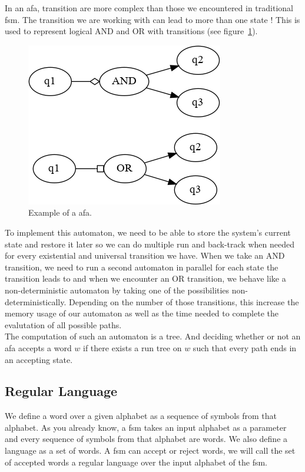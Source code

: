 \documentclass[12pt]{article}
\theoremstyle{definition}
\theoremstyle{definition}
\begin{document}
In an \gls{afa}, transition are more complex than those we encountered in traditional \gls{fsm}. The transition we are working with can lead to more than one state ! This is used to represent logical AND and OR with transitions (see figure~\ref{afa}).\\

\begin{figure}
    \centering
    \includegraphics[scale=0.8]{graph/afa.png}
    \caption{Example of a \gls{afa}.}
    \label{afa}
\end{figure}

To implement this automaton, we need to be able to store the system's current state and restore it later so we can do multiple run and back-track when needed for every existential and universal transition we have. When we take an AND transition, we need to run a second automaton in parallel for each state the transition leads to and when we encounter an OR transition, we behave like a non-deterministic automaton by taking one of the possibilities non-deterministically. Depending on the number of those transitions, this increase the memory usage of our automaton as well as the time needed to complete the evalutation of all possible paths.\\

The computation of such an automaton is a tree. And deciding whether or not an \gls{afa} accepts a word $w$ if there exists a run tree on $w$ such that every path ends in an accepting state.~\cite{AFA:2017}\\

\subsection{Regular Language}

We define a word over a given alphabet as a sequence of symbols from that alphabet. As you already know, a \gls{fsm} takes an input alphabet as a parameter and every sequence of symbols from that alphabet are words. We also define a language as a set of words. A \gls{fsm} can accept or reject words, we will call the set of accepted words a regular language over the input alphabet of the \gls{fsm}.
\end{document}
